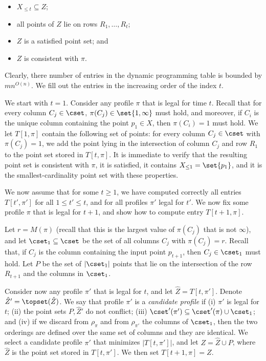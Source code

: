 \documentclass[11pt]{article}
\numberwithin{equation}{section}
\theoremstyle{definition}
\theoremstyle{plain}
\begin{document}
\begin{itemize}
	\item $X_{\leq t}\subseteq Z$;
	\item all points of $Z$ lie on rows $R_1,\ldots, R_t$;
\item 	$Z$ is a satisfied point set; and 
\item $Z$ is consistent with $\pi$.
\end{itemize}



Clearly, there number of entries in the dynamic programming table is bounded by $m n^{O(n)}$. We fill out the entries in the increasing order of the index $t$.  

We start with $t=1$. Consider any profile $\pi$ that is legal for time $t$. Recall that for every column $C_j\in \cset$, $\pi(C_j)\in \set{1,\infty}$ must hold, and moreover, if $C_i$ is the unique column containing the point $p_1\in X$, then $\pi(C_i)=1$ must hold.
We let $T[1,\pi]$ contain the following set of points: for every column $C_j\in \cset$ with $\pi(C_j)=1$, we add the point lying in the intersection of column $C_j$ and row $R_1$ to the point set stored in $T[t,\pi]$. It is immediate to verify that the resulting point set is consistent with $\pi$, it is satisfied, it contains $X_{\leq 1}=\set{p_1}$, and it is the smallest-cardinality point set with these properties.

We now assume that for some $t\geq 1$, we have computed correctly all entries $T[t',\pi']$ for all $1\leq t'\leq t$, and for all profiles $\pi'$ legal for $t'$. We now fix some profile $\pi$ that is legal for $t+1$, and show how to compute entry $T[t+1,\pi]$.

Let $r=M(\pi)$ (recall that this is the largest value of $\pi(C_j)$ that is not $\infty$), and let $\cset_1\subseteq \cset$ be the set of all columns $C_j$ with $\pi(C_j)=r$. Recall that, if $C_j$ is the column containing the input point $p_{t+1}$, then $C_j\in \cset_1$ must hold. Let $P$ be the set of $|\cset_1|$ points that lie on the intersection of the row $R_{t+1}$ and the columns in $\cset_1$.

Consider now any profile $\pi'$ that is legal for $t$, and let $\hat Z=T[t,\pi']$. Denote $\hat Z'=\topset(\hat Z)$. We say that profile $\pi'$ is a \emph{candidate profile} if (i) $\pi'$ is legal for $t$; (ii) the point sets $P,\hat Z'$ do not conflict; (iii) $\cset'(\pi')\subseteq \cset'(\pi)\cup \cset_1$; and (iv) if we discard from $\rho_{\pi}$ and from $\rho_{\pi'}$ the columns of $\cset_1$, then the two orderings are defined over the same set of columns and they are identical. We select a candidate profile $\pi'$ that minimizes $|T[t,\pi']|$, and let $Z=\hat Z\cup P$, where $\hat Z$ is the point set stored in $T[t,\pi']$. We then set $T[t+1,\pi]=Z$.
\end{document}
